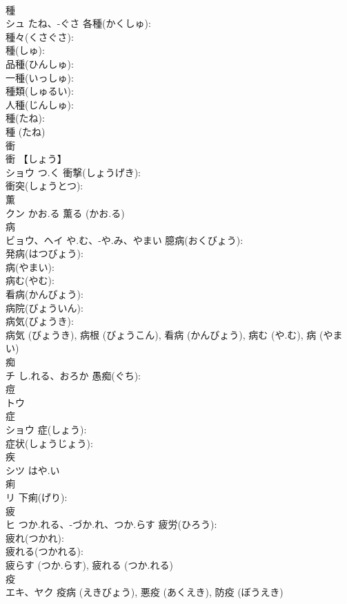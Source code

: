 \documentclass[8pt]{extreport}
\begin{document}
\begin{CJK}{UTF8}{min}
\\	種			
\\	シュ	たね、-ぐさ	各種(かくしゅ): 
\\	種々(くさぐさ): 
\\	種(しゅ): 
\\	品種(ひんしゅ): 
\\	一種(いっしゅ): 
\\	種類(しゅるい): 
\\	人種(じんしゅ): 
\\	種(たね): 
\\	種 (たね)
\\	衝			
\\	衝 【しょう】 
\\	ショウ	つ.く	衝撃(しょうげき): 
\\	衝突(しょうとつ): 
\\	薫			
\\	クン	かお.る		薫る (かお.る)
\\	病			
\\	ビョウ、ヘイ	や.む、-や.み、やまい	臆病(おくびょう): 
\\	発病(はつびょう): 
\\	病(やまい): 
\\	病む(やむ): 
\\	看病(かんびょう): 
\\	病院(びょういん): 
\\	病気(びょうき): 
\\	病気 (びょうき), 病根 (びょうこん), 看病 (かんびょう), 病む (や.む), 病 (やまい)
\\	痴			
\\	チ	し.れる、おろか	愚痴(ぐち): 
\\	痘			
\\	トウ			
\\	症			
\\	ショウ		症(しょう): 
\\	症状(しょうじょう): 
\\	疾			
\\	シツ	はや.い		
\\	痢			
\\	リ		下痢(げり): 
\\	疲			
\\	ヒ	つか.れる、-づか.れ、つか.らす	疲労(ひろう): 
\\	疲れ(つかれ): 
\\	疲れる(つかれる): 
\\	疲らす (つか.らす), 疲れる (つか.れる)
\\	疫			
\\	エキ、ヤク			疫病 (えきびょう), 悪疫 (あくえき), 防疫 (ぼうえき)

\end{CJK}
\end{document}
